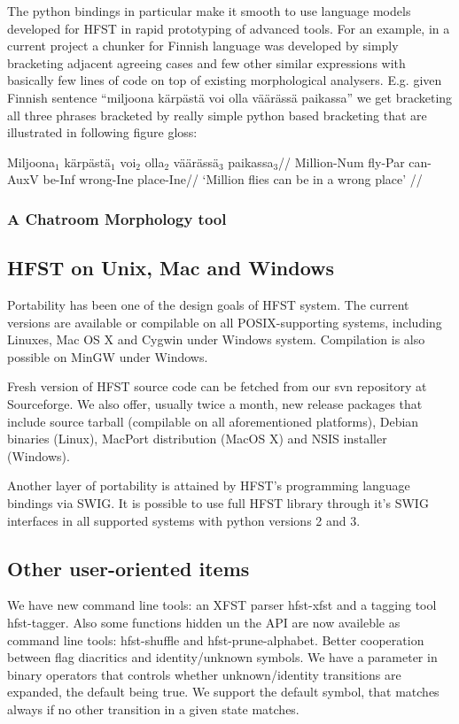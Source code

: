\documentclass{llncs}
\begin{document}
The python bindings in particular make it smooth to use language
models developed for HFST in rapid prototyping of advanced tools. For
an example, in a current project a chunker for Finnish language was
developed by simply bracketing adjacent agreeing cases and few other
similar expressions with basically few lines of code on top of
existing morphological analysers. E.g.  given Finnish sentence
``miljoona kärpästä voi olla väärässä paikassa'' we get bracketing all
three phrases bracketed by really simple python based bracketing that
are illustrated in following figure gloss:

\ex
\begingl
\gla Miljoona$_1$ kärpästä$_1$ voi$_2$ olla$_2$ väärässä$_3$ paikassa$_3$//
\glb Million-{\sc Num} fly-{\sc Par} can-{\sc AuxV} be-{\sc Inf} wrong-{\sc Ine} place-{\sc Ine}//
\glft `Million flies can be in a wrong place' //
\endgl
\xe


\subsubsection{A Chatroom Morphology tool}

\subsection{HFST on Unix, Mac and Windows}

Portability has been one of the design goals of HFST system. The
current versions are available or compilable on all POSIX-supporting
systems, including Linuxes, Mac OS X and Cygwin under Windows
system. Compilation is also possible on MinGW under Windows.

Fresh version of HFST source code can be fetched from our svn
repository at Sourceforge. We also offer, usually twice a month, new
release packages that include source tarball (compilable on all
aforementioned platforms), Debian binaries (Linux), MacPort
distribution (MacOS X) and NSIS installer (Windows).

Another layer of portability is attained by HFST's programming
language bindings via SWIG. It is possible to use full HFST library
through it's SWIG interfaces in all supported systems with python
versions 2 and 3.


\subsection{Other user-oriented items}

We have new command line tools: an XFST parser hfst-xfst and a tagging
tool hfst-tagger. Also some functions hidden un the API are now
availeble as command line tools: hfst-shuffle and hfst-prune-alphabet.
Better cooperation between flag diacritics and identity/unknown
symbols. We have a parameter in binary operators that controls whether
unknown/identity transitions are expanded, the default being true. We
support the default symbol, that matches always if no other transition
in a given state matches.
\end{document}
